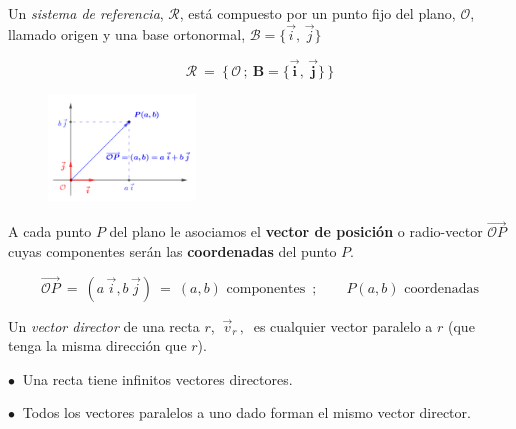 \vspace{5mm}
\begin{definition}

\begin{multicols}{2}
Un \emph{sistema de referencia}, $\mathcal R$, está compuesto por un punto fijo del plano, $\mathcal O$, llamado origen y una base ortonormal, $\mathcal B=\{\vec i,\, \vec j\}$

$$\boldsymbol{ \mathcal R \ = \ \{ \, \mathcal O \, ; \ B=\{\vec i,\, \vec j\} \,  \} } $$
\begin{figure}[H]
	\centering
	\includegraphics[width=0.35\textwidth]{img-ga/ga04.png}
\end{figure}	
\end{multicols}

A cada punto $P$ del plano le asociamos el \textbf{vector de posición} o radio-vector $\overrightarrow{\mathcal OP}$ cuyas componentes serán las \textbf{coordenadas} del punto $P$.

$$\overrightarrow{\mathcal OP} \ = \ (a\, \vec i , b\, \vec j) \ = \ (a,b) \text{ componentes } \,; \qquad  P(a,b) \text{ coordenadas}$$
\end{definition}

\vspace{5mm}
\begin{definition}

Un \emph{vector director} de una recta $r$, $\ \vec v_r\, , \ $	 es cualquier vector paralelo a $r$ (que tenga la misma dirección que $r$). 

\vspace{2mm} \hspace{1cm} $\bullet \ $ Una recta tiene infinitos vectores directores.

\vspace{2mm} \hspace{1cm} $\bullet\ $ Todos los vectores paralelos a uno dado forman el mismo vector director.
\end{definition}

